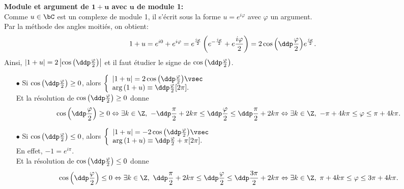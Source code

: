 
\begin{correction}   \; \textbf{Module et argument de $\mathbf{1+u}$ avec $\mathbf{u}$ de module 1:}\\
Comme $u\in\bC$ est un complexe de module 1, il s'\'ecrit sous la forme $u=e^{i\varphi}$ avec $\varphi$ un argument.\\
Par la m\'ethode des angles moiti\'es, on obtient:
$$
1+u = e^{i0}+e^{i\varphi}= e^{\frac{i\varphi}{2}}\left( e^{-\frac{i\varphi}{2}}+e{\frac{i\varphi}{2}}  \right)= 2\cos{\left(\ddp\frac{\varphi}{2}  \right)}e^{\frac{i\varphi}{2}}.$$
Ainsi, $|1+u|=2\left|\cos{\left(\ddp\frac{\varphi}{2}\right)}\right|$ et il faut \'etudier le signe de $\cos{\left(\ddp\frac{\varphi}{2}\right)}$.
\begin{itemize}
 \item[$\bullet$] Si $\cos{\left(\ddp\frac{\varphi}{2}\right)}\geq 0$, alors $\left\lbrace\begin{array}{l}
|1+u|=2\cos{\left(\ddp\frac{\varphi}{2}\right)} \vsec\\
\arg{(1+u)}\equiv \ddp\frac{\varphi}{2}\lbrack 2\pi\rbrack.
\end{array}\right.$\\
Et la r\'esolution de $\cos{\left(\ddp\frac{\varphi}{2}\right)}\geq 0$ donne
$$
\cos{\left(\ddp\frac{\varphi}{2}\right)}\geq 0  \Leftrightarrow \exists k\in\Z,\ -\ddp\frac{\pi}{2}+2k\pi\leq \ddp\frac{\varphi}{2}\leq \ddp\frac{\pi}{2}+2k\pi\Leftrightarrow  \exists k\in\Z,\ -\pi+4k\pi\leq \varphi\leq \pi+4k\pi.$$
\item[$\bullet$] Si $\cos{\left(\ddp\frac{\varphi}{2}\right)}\leq 0$, alors $\left\lbrace\begin{array}{l}
|1+u|=-2\cos{\left(\ddp\frac{\varphi}{2}\right)} \vsec\\
\arg{(1+u)}\equiv \ddp\frac{\varphi}{2}+\pi\lbrack 2\pi\rbrack.
\end{array}\right.$\\
En effet, $-1=e^{i\pi}$.\\
Et la r\'esolution de $\cos{\left(\ddp\frac{\varphi}{2}\right)}\leq 0$ donne
$$
\cos{\left(\ddp\frac{\varphi}{2}\right)}\leq 0  \Leftrightarrow \exists k\in\Z,\ \ddp\frac{\pi}{2}+2k\pi\leq \ddp\frac{\varphi}{2}\leq \ddp\frac{3\pi}{2}+2k\pi
\Leftrightarrow  \exists k\in\Z,\ \pi+4k\pi\leq \varphi\leq 3\pi+4k\pi.$$  
\end{itemize}
\end{correction}